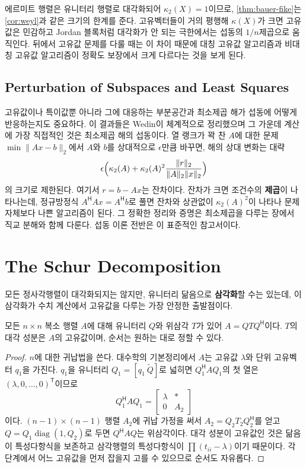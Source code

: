 에르미트 행렬은 유니터리 행렬로 대각화되어 $\kappa_2(X)=1$이므로, \cref{thm:bauer-fike}는 \cref{cor:weyl}과 같은 크기의 한계를 준다\cite{bauer1960fike}. 고유벡터들이 거의 평행해 $\kappa(X)$가 크면 고유값은 민감하고 Jordan 블록처럼 대각화가 안 되는 극한에서는 섭동의 $1/n$제곱으로 움직인다. 뒤에서 고유값 문제를 다룰 때는 이 차이 때문에 대칭 고유값 알고리즘과 비대칭 고유값 알고리즘이 정확도 보장에서 크게 다르다는 것을 보게 된다.

\subsection{Perturbation of Subspaces and Least Squares}

고유값이나 특이값뿐 아니라 그에 대응하는 부분공간과 최소제곱 해가 섭동에 어떻게 반응하는지도 중요하다. 이 결과들은 Wedin이 체계적으로 정리했으며\cite{wedin1972} 그 가운데 계산에 가장 직접적인 것은 최소제곱 해의 섭동이다. 열 랭크가 꽉 찬 $A$에 대한 문제 $\min\|Ax-b\|_2$에서 $A$와 $b$를 상대적으로 $\epsilon$만큼 바꾸면, 해의 상대 변화는 대략
\[
\epsilon\Bigl(\kappa_2(A)+\kappa_2(A)^2\frac{\|r\|_2}{\|A\|_2\|x\|_2}\Bigr)
\]
의 크기로 제한된다. 여기서 $r=b-Ax$는 잔차이다. 잔차가 크면 조건수의 \textbf{제곱}이 나타나는데, 정규방정식 $A^{\mathsf H}Ax=A^{\mathsf H}b$로 풀면 잔차와 상관없이 $\kappa_2(A)^2$이 나타나 문제 자체보다 나쁜 알고리즘이 된다. 그 정확한 정리와 증명은 최소제곱을 다루는 장에서 직교 분해와 함께 다룬다. 섭동 이론 전반은 \cite{stewart1990perturbation}이 표준적인 참고서이다.

\section{The Schur Decomposition}
\label{sec:schur}

모든 정사각행렬이 대각화되지는 않지만, 유니터리 닮음으로 \textbf{삼각화}할 수는 있는데, 이 삼각화가 수치 계산에서 고유값을 다루는 가장 안정한 출발점이다.

\begin{theorem}[Schur]
\label{thm:schur}
모든 $n\times n$ 복소 행렬 $A$에 대해 유니터리 $Q$와 위삼각 $T$가 있어 $A=QTQ^{\mathsf H}$이다. $T$의 대각 성분은 $A$의 고유값이며, 순서는 원하는 대로 정할 수 있다.
\end{theorem}

\begin{proof}
$n$에 대한 귀납법을 쓴다. 대수학의 기본정리에서 $A$는 고유값 $\lambda$와 단위 고유벡터 $q_1$을 가진다. $q_1$을 유니터리 $Q_1=[q_1\ \widetilde Q]$로 넓히면 $Q_1^{\mathsf H}AQ_1$의 첫 열은 $(\lambda,0,\dots,0)^{\mathsf T}$이므로
\[
Q_1^{\mathsf H}AQ_1=\begin{bmatrix}\lambda&*\\0&A_2\end{bmatrix}
\]
이다. $(n-1)\times(n-1)$ 행렬 $A_2$에 귀납 가정을 써서 $A_2=Q_2T_2Q_2^{\mathsf H}$를 얻고 $Q=Q_1\operatorname{diag}(1,Q_2)$로 두면 $Q^{\mathsf H}AQ$는 위삼각이다. 대각 성분이 고유값인 것은 닮음이 특성다항식을 보존하고 삼각행렬의 특성다항식이 $\prod(t_{ii}-\lambda)$이기 때문이다. 각 단계에서 어느 고유값을 먼저 잡을지 고를 수 있으므로 순서도 자유롭다.
\end{proof}

